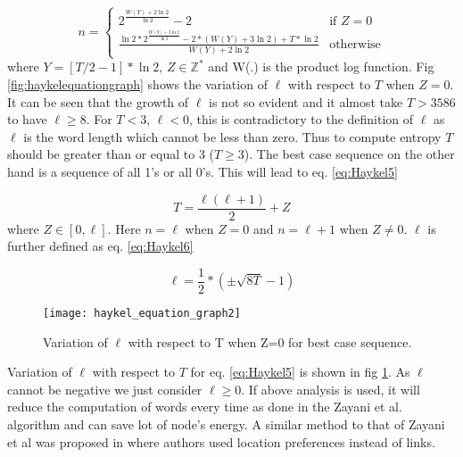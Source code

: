 \documentclass[preprint, twocolumn,5p]{elsarticle}
\begin{document}
        \begin {equation}\label{eq:Haykel4}
        n=\begin{cases}
         2^{\frac{W(Y)+2\ln2}{\ln2}}-2 & \text{if } Z=0\\
         \frac{\ln2*2^{\frac{W(Y)+3\ln2}{\ln2}}-2*(W(Y)+3\ln2)+T*\ln2}{W(Y)+2\ln2}& \text{otherwise}
        \end{cases}
        \end{equation}
        where $Y=[T/2-1]*\ln2$, $Z\in \mathbb{Z}^{*}$ and W(.) is the product log function. Fig \ref{fig:haykelequationgraph} shows the variation of $\ell$ with respect to $T$ when $Z=0$. It can be seen that the growth of $\ell$ is not so evident and it almost take $T>3586$ to have $\ell\geq8$. For $T<3$, $\ell<0$, this is contradictory to the definition of $\ell$ as $\ell$ is the word length which cannot be less than zero. Thus to compute entropy $T$ should be greater than or equal to $3$ ($T\geq3$). The best case sequence on the other hand is a sequence of all 1's or all 0's. This will lead to eq. \ref{eq:Haykel5}

        \begin {equation}\label{eq:Haykel5}
        T=\frac{\ell(\ell+1)}{2}+Z
        \end{equation}
        where $Z\in[0,\ell]$. Here $n=\ell$ when $Z=0$ and $n=\ell +1$ when $Z\neq0$. $\ell$ is further defined as eq. \ref{eq:Haykel6}

        \begin {equation}\label{eq:Haykel6}
        \ell=\frac{1}{2}*(\pm\sqrt{8T}-1)
        \end{equation}

        \begin{figure}
            \centering
            \texttt{[image: haykel\_equation\_graph2]}
            \caption{Variation of $\ell$ with respect to T when Z=0 for best case sequence.}
            \label{fig:haykelequationgraph2}
        \end{figure}

        Variation of $\ell$ with respect to $T$ for eq. \ref{eq:Haykel5} is shown in fig \ref{fig:haykelequationgraph2}. As $\ell$ cannot be negative we just consider $\ell\geq 0$. If above analysis is used, it will reduce the computation of words every time as done in the Zayani et al. algorithm and can save lot of node's energy. A similar method to that of Zayani et al was proposed in \cite{Song2010} where authors used location preferences instead of links.
\end{document}
